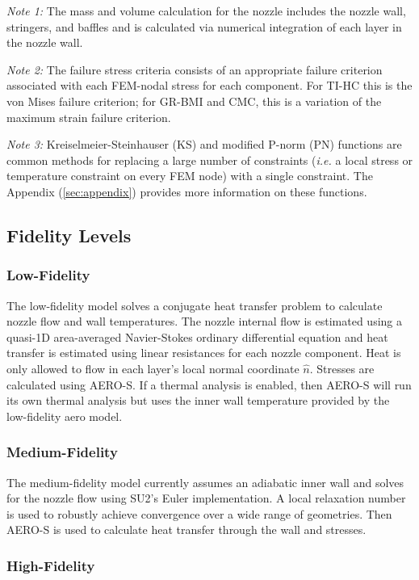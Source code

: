 \documentclass{article}
\begin{document}
\textit{Note 1:} The mass and volume calculation for the nozzle includes the nozzle wall, stringers, and baffles and is calculated via numerical integration of each layer in the nozzle wall.

\textit{Note 2:} The failure stress criteria consists of an appropriate failure criterion associated with each FEM-nodal stress for each component. For TI-HC this is the von Mises failure criterion; for GR-BMI and CMC, this is a variation of the maximum strain failure criterion.

\textit{Note 3:} Kreiselmeier-Steinhauser (KS) and modified P-norm (PN) functions are common methods for replacing a large number of constraints (\textit{i.e.} a local stress or temperature constraint on every FEM node) with a single constraint. The Appendix (\ref{sec:appendix}) provides more information on these functions.

\subsection{Fidelity Levels}

\subsubsection{Low-Fidelity}

The low-fidelity model solves a conjugate heat transfer problem to calculate nozzle flow and wall temperatures. The nozzle internal flow is estimated using a quasi-1D area-averaged Navier-Stokes ordinary differential equation and heat transfer is estimated using linear resistances for each nozzle component. Heat is only allowed to flow in each layer's local normal coordinate $\hat{n}$. Stresses are calculated using AERO-S. If a thermal analysis is enabled, then AERO-S will run its own thermal analysis but uses the inner wall temperature provided by the low-fidelity aero model.

\subsubsection{Medium-Fidelity}

The medium-fidelity model currently assumes an adiabatic inner wall and solves for the nozzle flow using SU2's Euler implementation. A local relaxation number is used to robustly achieve convergence over a wide range of geometries. Then AERO-S is used to calculate heat transfer through the wall and stresses. 

\subsubsection{High-Fidelity}
\end{document}
